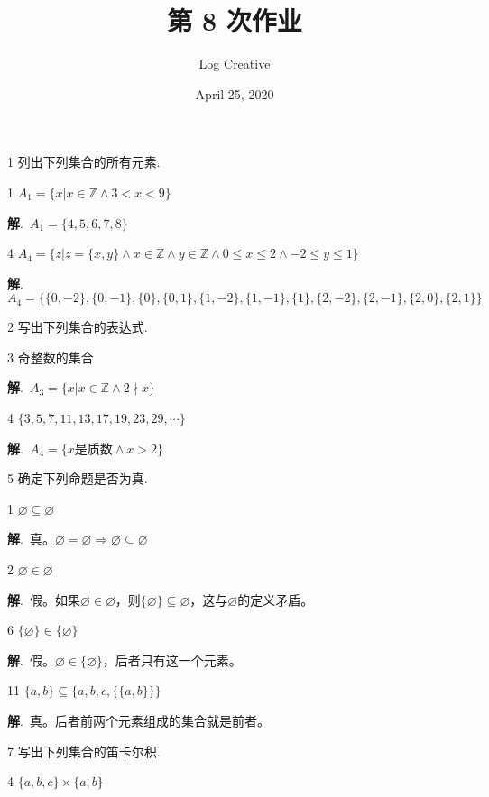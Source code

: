 \documentclass[12pt]{article}
\title{第 8 次作业}
\author{Log Creative}
\date{April 25, 2020}
\newenvironment{firstlayer}%
{\begin{list}{}{\renewcommand{\makelabel}[1]{\textbf{##1}.\hfil}
}}
{\end{list}}
\newenvironment{secondlayer}%
{\begin{list}{}{\renewcommand{\makelabel}[1]{(##1)\hfil}
}}
{\end{list}}
\providecommand{\sol}{\textbf{解}.~}
\begin{document}
\begin{CJK}{UTF8}{gbsn}

\maketitle

\begin{firstlayer}
  \item[1]列出下列集合的所有元素.
  \begin{secondlayer}
    \item[1]$A_1=\{x|x\in \mathbb{Z} \wedge 3<x<9\}$
    
    \sol $A_1=\{ 4,5,6,7,8 \}$
    \item[4]$A_4=\{z|z=\{x,y\}\wedge x\in \mathbb{Z} \wedge y\in \mathbb{Z} \wedge 0\leq x \leq 2 \wedge -2\leq y\leq 1 \}$
    
    \sol $A_4=\{ \{ 0,-2 \},\{ 0,-1 \},\{ 0 \},\{ 0,1 \},\{ 1,-2 \},\{ 1,-1 \},\{ 1 \},\{ 2,-2 \},\{ 2,-1 \},\{ 2,0 \},\{ 2,1 \} \}$
  \end{secondlayer}
  \item[2]写出下列集合的表达式.
  \begin{secondlayer}
    \item[3]奇整数的集合
    
    \sol $A_3=\{ x|x\in \mathbb{Z} \wedge 2 \nmid x\}$
    \item[4]$\{3,5,7,11,13,17,19,23,29,\cdots\}$
    
    \sol $A_4=\{ x\text{是质数} \wedge x>2 \}$
  \end{secondlayer}
  \item[5]确定下列命题是否为真.
  \begin{secondlayer}
    \item[1]$\varnothing \subseteq \varnothing$
    
    \sol 真。$\varnothing = \varnothing \Rightarrow \varnothing \subseteq \varnothing$
    \item[2]$\varnothing \in \varnothing$
    
    \sol 假。如果$\varnothing \in \varnothing$，则$\{ \varnothing \}\subseteq \varnothing$，这与$\varnothing$的定义矛盾。
    \item[6]$\{\varnothing\} \in \{\varnothing\}$
    
    \sol 假。$\varnothing \in \{\varnothing\}$，后者只有这一个元素。
    \item[11]$\{a,b\}\subseteq \{ a,b,c,\{ \{ a,b\}\} \}$
    
    \sol 真。后者前两个元素组成的集合就是前者。
  \end{secondlayer}
  \item[7]写出下列集合的笛卡尔积.
  \begin{secondlayer}
    \item[4]$\{ a,b,c \} \times \{ a,b \}$
    

\end{secondlayer}
\end{firstlayer}
\end{CJK}
\end{document}
